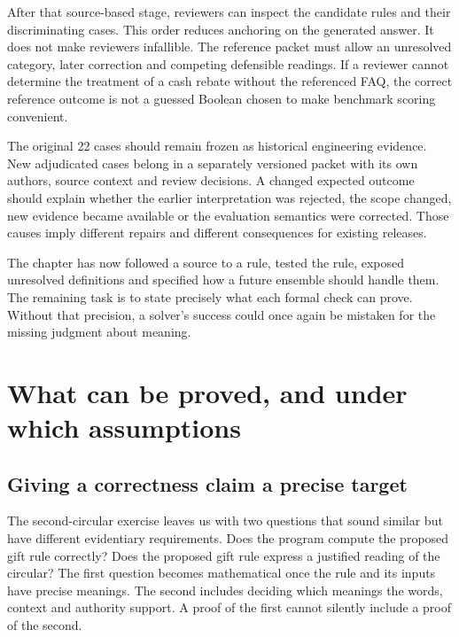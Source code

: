 \documentclass[12pt,a4paper,oneside,openany]{book}
\begin{document}
After that source-based stage, reviewers can inspect the candidate rules and
their discriminating cases. This order reduces anchoring on the generated
answer. It does not make reviewers infallible. The reference packet must allow
an unresolved category, later correction and competing defensible readings.
If a reviewer cannot determine the treatment of a cash rebate without the
referenced FAQ, the correct reference outcome is not a guessed Boolean chosen
to make benchmark scoring convenient.

The original 22 cases should remain frozen as historical engineering evidence.
New adjudicated cases belong in a separately versioned packet with its own
authors, source context and review decisions. A changed expected outcome should
explain whether the earlier interpretation was rejected, the scope changed,
new evidence became available or the evaluation semantics were corrected.
Those causes imply different repairs and different consequences for existing
releases.

The chapter has now followed a source to a rule, tested the rule, exposed
unresolved definitions and specified how a future ensemble should handle them.
The remaining task is to state precisely what each formal check can prove.
Without that precision, a solver's success could once again be mistaken for
the missing judgment about meaning.


\chapter{What can be proved, and under which assumptions}
\label{ch:proof}

\section{Giving a correctness claim a precise target}
\label{merge:M03:00}

\label{sec:proof-target}
The second-circular exercise leaves us with two questions that sound similar but
have different evidentiary requirements. Does the program compute the proposed
gift rule correctly? Does the proposed gift rule express a justified reading of
the circular? The first question becomes mathematical once the rule and its
inputs have precise meanings. The second includes deciding which meanings the
words, context and authority support. A proof of the first cannot silently
include a proof of the second.
\end{document}
